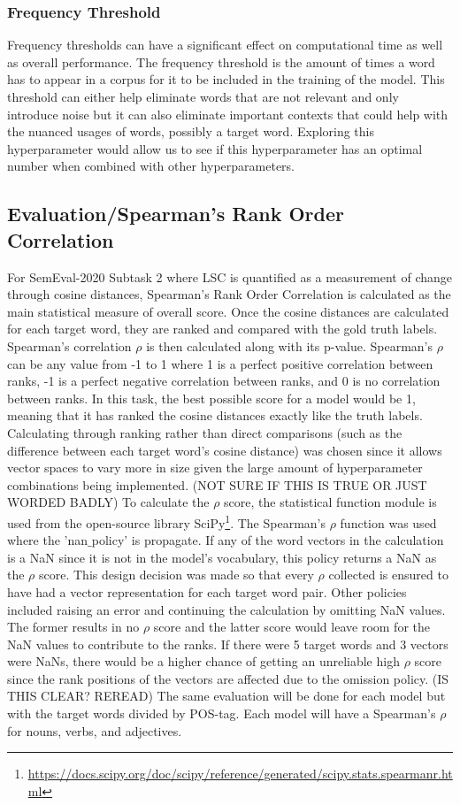 \subsubsection{Frequency Threshold}
Frequency thresholds can have a significant effect on computational time as well as overall performance. The frequency threshold is the amount of times a word has to appear in a corpus for it to be included in the training of the model. This threshold can either help eliminate words that are not relevant and only introduce noise but it can also eliminate important contexts that could help with the nuanced usages of words, possibly a target word. Exploring this hyperparameter would allow us to see if this hyperparameter has an optimal number when combined with other hyperparameters. 

\subsection{Evaluation/Spearman's Rank Order Correlation}
For SemEval-2020 Subtask 2 where LSC is quantified as a measurement of change through cosine distances, Spearman’s Rank Order Correlation is calculated as the main statistical measure of overall score. Once the cosine distances are calculated for each target word, they are ranked and compared with the gold truth labels. Spearman's correlation $\rho$ is then calculated along with its p-value. Spearman’s $\rho$ can be any value from -1 to 1 where 1 is a perfect positive correlation between ranks, -1 is a perfect negative correlation between ranks, and 0 is no correlation between ranks. In this task, the best possible score for a model would be 1, meaning that it has ranked the cosine distances exactly like the truth labels. Calculating through ranking rather than direct comparisons (such as the difference between each target word’s cosine distance) was chosen since it allows vector spaces to vary more in size given the large amount of hyperparameter combinations being implemented. (NOT SURE IF THIS IS TRUE OR JUST WORDED BADLY) To calculate the $\rho$ score, the statistical function module is used from the open-source library SciPy\footnote{\url{https://docs.scipy.org/doc/scipy/reference/generated/scipy.stats.spearmanr.html}}. The Spearman's $\rho$ function was used where the 'nan$\_$policy' is propagate. If any of the word vectors in the calculation is a NaN since it is not in the model's vocabulary, this policy returns a NaN as the $\rho$ score. This design decision was made so that every $\rho$ collected is ensured to have had a vector representation for each target word pair. Other policies included raising an error and continuing the calculation by omitting NaN values. The former results in no $\rho$ score and the latter score would leave room for the NaN values to contribute to the ranks. If there were 5 target words and 3 vectors were NaNs, there would be a higher chance of getting an unreliable high $\rho$ score since the rank positions of the vectors are affected due to the omission policy. (IS THIS CLEAR? REREAD) The same evaluation will be done for each model but with the target words divided by POS-tag. Each model will have a Spearman’s $\rho$ for nouns, verbs, and adjectives. 


